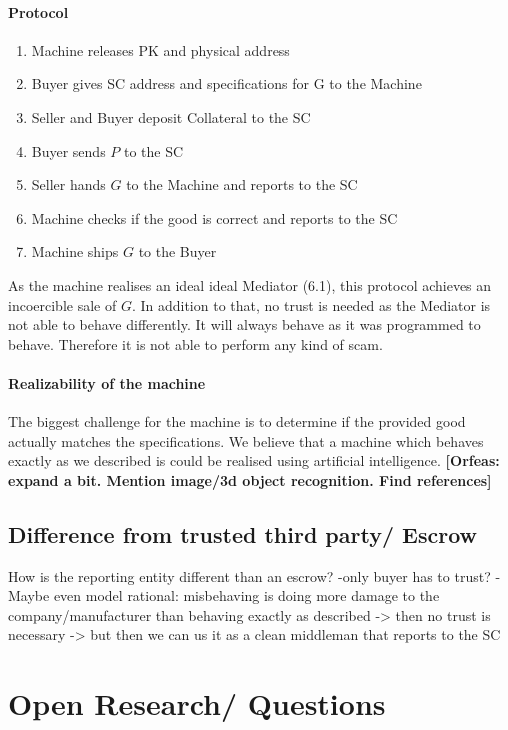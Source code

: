 \documentclass{cacthesis}
\newcommand{\authnote}[3]{{ \footnotesize \textbf{#1[#2: #3]~}}}
\newcommand{\orfnote}[1]{\authnote{\color{blue}}{Orfeas}{#1}}
\begin{document}
\subsubsection{Protocol}
\begin{enumerate}
    \item Machine releases PK and physical address
    \item Buyer gives SC address and specifications for G to the Machine
    \item Seller and Buyer deposit Collateral to the SC
    \item Buyer sends $P$ to the SC
    \item Seller hands $G$ to the Machine and reports to the SC
    \item Machine checks if the good is correct and reports to the SC
    \item Machine ships $G$ to the Buyer
\end{enumerate}
As the machine realises an ideal ideal Mediator (6.1), this protocol achieves an incoercible sale of $G$.\newline
In addition to that, no trust is needed as the Mediator is not able to behave differently. It will always behave as it was programmed to behave. Therefore it is not able to perform any kind of scam.

\subsubsection{Realizability of the machine} 
The biggest challenge for the machine is to determine if the provided good actually matches the specifications.\newline
We believe that a machine which behaves exactly as we described is could be
realised using artificial intelligence. \orfnote{expand a bit. Mention image/3d
object recognition. Find references}
\section{Difference from trusted third party/ Escrow}
How is the reporting entity different than an escrow?
-only buyer has to trust?
-Maybe even model rational: misbehaving is doing more damage to the company/manufacturer than behaving exactly as described -> then no trust is necessary -> but then we can us it as a clean middleman that reports to the SC
\chapter{Open Research/ Questions}
\end{document}
